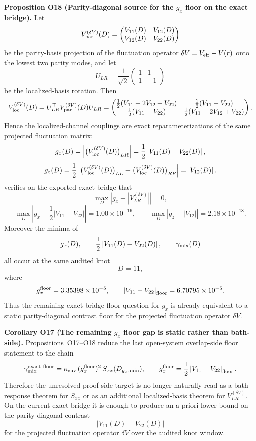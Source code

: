 \documentclass[aps,prd,onecolumn,notitlepage,nofootinbib,superscriptaddress,11pt,floatfix]{revtex4-2}
\begin{document}
\medskip\noindent\textbf{Proposition O18 (Parity-diagonal source for the \texorpdfstring{$g_x$}{gx} floor on the exact bridge).}
Let
\[
V_{\rm par}^{(\delta V)}(D)
=
\begin{pmatrix}
V_{11}(D) & V_{12}(D)\\
V_{12}(D) & V_{22}(D)
\end{pmatrix}
\]
be the parity-basis projection of the fluctuation operator $\delta V=V_{\rm eff}-\bar V(r)$ onto the lowest two parity modes, and let
\[
U_{LR}=\frac{1}{\sqrt 2}
\begin{pmatrix}
1&1\\
1&-1
\end{pmatrix}
\]
be the localized-basis rotation.  Then
\[
V_{\rm loc}^{(\delta V)}(D)
=
U_{LR}^{\top}V_{\rm par}^{(\delta V)}(D)U_{LR}
=
\begin{pmatrix}
\tfrac12(V_{11}+2V_{12}+V_{22}) & \tfrac12(V_{11}-V_{22})\\
\tfrac12(V_{11}-V_{22}) & \tfrac12(V_{11}-2V_{12}+V_{22})
\end{pmatrix}.
\]
Hence the localized-channel couplings are exact reparameterizations of the same projected fluctuation matrix:
\[
g_x(D)=\left|\bigl(V_{\rm loc}^{(\delta V)}(D)\bigr)_{LR}\right|
=
\frac12\left|V_{11}(D)-V_{22}(D)\right|,
\]
\[
g_z(D)=\frac12\left|\bigl(V_{\rm loc}^{(\delta V)}(D)\bigr)_{LL}-\bigl(V_{\rm loc}^{(\delta V)}(D)\bigr)_{RR}\right|
=
\left|V_{12}(D)\right|.
\]
 verifies on the exported exact bridge that
\[
\max_D\left|g_x-\left|V_{LR}^{(\delta V)}\right|\right|=0,
\]
\[
\max_D\left|g_x-\frac12\left|V_{11}-V_{22}\right|\right|
=1.00\times10^{-16},
\qquad
\max_D\left|g_z-\left|V_{12}\right|\right|
=2.18\times10^{-18}.
\]
Moreover the minima of
\[
g_x(D),\qquad
\frac12\left|V_{11}(D)-V_{22}(D)\right|,\qquad
\gamma_{\rm mix}(D)
\]
all occur at the same audited knot
\[
D=11,
\]
where
\[
g_x^{\rm floor}=3.35398\times10^{-5},
\qquad
\left|V_{11}-V_{22}\right|_{\rm floor}=6.70795\times10^{-5}.
\]
Thus the remaining exact-bridge floor question for $g_x$ is already equivalent to a static parity-diagonal contrast floor for the projected fluctuation operator $\delta V$.

\medskip\noindent\textbf{Corollary O17 (The remaining \texorpdfstring{$g_x$}{gx} floor gap is static rather than bath-side).}
Propositions~O17--O18 reduce the last open-system overlap-side floor statement to the chain
\[
\gamma_{\rm mix}^{\rm exact\ floor}
=
\kappa_{\rm env}\,(g_x^{\rm floor})^2\,S_{xx}(D_{g_x,\min}),
\qquad
g_x^{\rm floor}
=
\frac12\left|V_{11}-V_{22}\right|_{\rm floor}.
\]
Therefore the unresolved proof-side target is no longer naturally read as a bath-response theorem for $S_{xx}$ or as an additional localized-basis theorem for $V_{LR}^{(\delta V)}$.  On the current exact bridge it is enough to produce an a priori lower bound on the parity-diagonal contrast
\[
\left|V_{11}(D)-V_{22}(D)\right|
\]
for the projected fluctuation operator $\delta V$ over the audited knot window.
\end{document}
